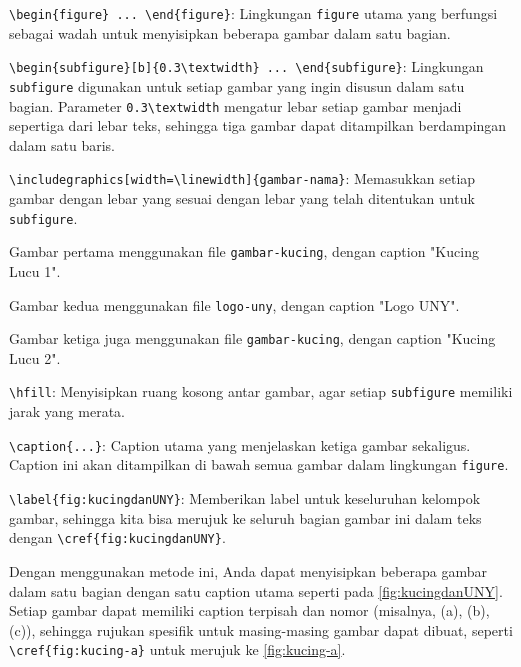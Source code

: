 \begin{packed_enum}
    \item \texttt{\textbackslash begin\{figure\} ... \textbackslash end\{figure\}}: Lingkungan \texttt{figure} utama yang berfungsi sebagai wadah untuk menyisipkan beberapa gambar dalam satu bagian.
    
    \item \texttt{\textbackslash begin\{subfigure\}[b]\{0.3\textbackslash textwidth\} ... \textbackslash end\{subfigure\}}: Lingkungan \texttt{subfigure} digunakan untuk setiap gambar yang ingin disusun dalam satu bagian. Parameter \texttt{0.3\textbackslash textwidth} mengatur lebar setiap gambar menjadi sepertiga dari lebar teks, sehingga tiga gambar dapat ditampilkan berdampingan dalam satu baris.
    
    \item \texttt{\textbackslash includegraphics[width=\textbackslash linewidth]\{gambar-nama\}}: Memasukkan setiap gambar dengan lebar yang sesuai dengan lebar yang telah ditentukan untuk \texttt{subfigure}. 
        \begin{packed_enum}
            \item Gambar pertama menggunakan file \texttt{gambar-kucing}, dengan caption "Kucing Lucu 1".
            \item Gambar kedua menggunakan file \texttt{logo-uny}, dengan caption "Logo UNY".
            \item Gambar ketiga juga menggunakan file \texttt{gambar-kucing}, dengan caption "Kucing Lucu 2".
        \end{packed_enum}
    
    \item \texttt{\textbackslash hfill}: Menyisipkan ruang kosong antar gambar, agar setiap \texttt{subfigure} memiliki jarak yang merata.
    
    \item \texttt{\textbackslash caption\{...\}}: Caption utama yang menjelaskan ketiga gambar sekaligus. Caption ini akan ditampilkan di bawah semua gambar dalam lingkungan \texttt{figure}.

    \item \texttt{\textbackslash label\{fig:kucingdanUNY\}}: Memberikan label untuk keseluruhan kelompok gambar, sehingga kita bisa merujuk ke seluruh bagian gambar ini dalam teks dengan \texttt{\textbackslash cref\{fig:kucingdanUNY\}}.
\end{packed_enum}

Dengan menggunakan metode ini, Anda dapat menyisipkan beberapa gambar dalam satu bagian dengan satu caption utama seperti pada \cref{fig:kucingdanUNY}. Setiap gambar dapat memiliki caption terpisah dan nomor (misalnya, (a), (b), (c)), sehingga rujukan spesifik untuk masing-masing gambar dapat dibuat, seperti \texttt{\textbackslash cref\{fig:kucing-a\}} untuk merujuk ke \cref{fig:kucing-a}.


